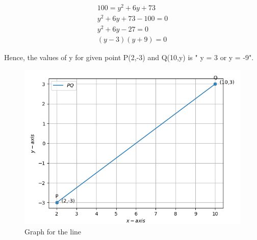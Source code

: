 \documentclass[12pt]{article}
\begin{document}
\begin{enumerate}
	\begin{align}
			100 = y^2 + 6y + 73 \\
				y^2 + 6y + 73 - 100 = 0 \\
					y^2 + 6y - 27 = 0 \\
						(y-3)(y+9) = 0 
	\end{align}
	
    Hence, the values of y for given point P(2,-3) and Q(10,y) is " y = 3 or y = -9".	
\hspace{3mm}
\begin{figure}[!h]
	\begin{center}
	\includegraphics[width=6in]{graph.png}	
	\end{center}
		
\caption{Graph for the line}
\label{fig:Fig}
\end{figure}
\end{enumerate}
\end{document}
